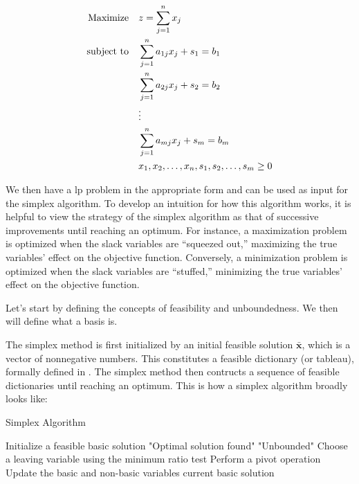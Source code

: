 \begin{align}
    \text{Maximize} \quad   & z = \sum_{j=1}^{n} x_j \notag                            \\
    \text{subject to} \quad & \sum_{j=1}^{n} a_{1j} x_j + s_1 = b_1 \notag               \\
                            & \sum_{j=1}^{n} a_{2j} x_j + s_2 = b_2 \notag               \\
                            & \vdots \notag                                            \\
                            & \sum_{j=1}^{n} a_{mj} x_j + s_m = b_m \label{LP_Problem_Comp}   \\
                            & x_1, x_2, \dots, x_n, s_1, s_2, \dots, s_m \geq 0 \notag
\end{align}

We then have a \gls{lp} problem in the appropriate form and can be used as input for
the simplex algorithm. To develop an intuition for how this algorithm works,
it is helpful to view the strategy of the simplex algorithm as that of 
successive improvements until reaching an optimum. For instance, a maximization problem is optimized when the slack 
variables are “squeezed out,” maximizing the true variables’ effect on the objective 
function. Conversely, a minimization problem is optimized when the slack variables 
are “stuffed,” minimizing the true variables’ effect on the objective function.

Let's start by defining the concepts of feasibility and unboundedness. 
We then will define what a basis is.

The simplex method is first initialized by 
an initial feasible solution $\mathbf{\bar{x}}$, which is a vector of nonnegative numbers.
This constitutes a feasible dictionary (or tableau), formally defined in \parencite{chvatal1983linear}. 
The simplex method then contructs a sequence of feasible dictionaries until reaching an optimum. 
This is how a simplex algorithm broadly looks like:

\begin{algorithm}
    \caption{Simplex Algorithm}
    \begin{algorithmic}[1]
        \State Initialize a feasible basic solution
            \State \Return "Optimal solution found"
        \EndIf
            \State \Return "Unbounded"
        \EndIf
        \State Choose a leaving variable using the minimum ratio test
        \State Perform a pivot operation
        \State Update the basic and non-basic variables
        \State \Return current basic solution
    \EndProcedure
    \end{algorithmic}
    \end{algorithm}


